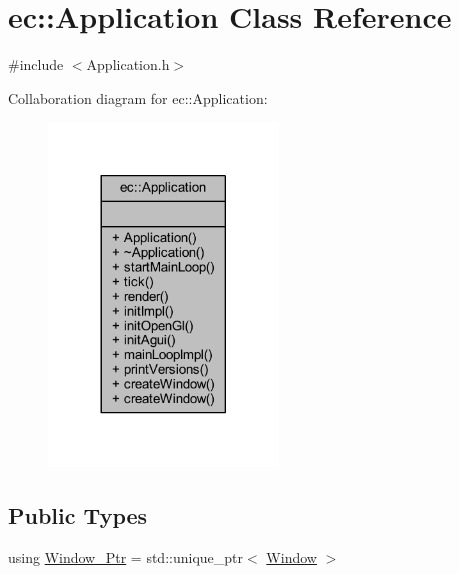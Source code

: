 \hypertarget{classec_1_1_application}{}\section{ec\+:\+:Application Class Reference}
\label{classec_1_1_application}


{\ttfamily \#include $<$Application.\+h$>$}



Collaboration diagram for ec\+:\+:Application\+:\nopagebreak
\begin{figure}[H]
\begin{center}
\leavevmode
\includegraphics[width=173pt]{classec_1_1_application__coll__graph}
\end{center}
\end{figure}
\subsection*{Public Types}
\begin{DoxyCompactItemize}
\item 
using \mbox{\hyperlink{classec_1_1_application_af1e09a0f1b603eab8d3245d8b8075ad5}{Window\+\_\+\+Ptr}} = std\+::unique\+\_\+ptr$<$ \mbox{\hyperlink{classec_1_1_window}{Window}} $>$
\end{DoxyCompactItemize}
